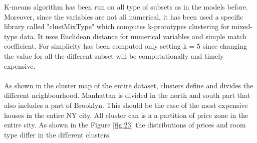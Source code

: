 \documentclass{FR16}
\begin{document}
K-means algorithm has been run on all type of subsets as in the models before. Moreover, since the variables are not all numerical, it has been used a specific library called "clustMixType" which computes k-prototypes clustering for mixed-type data. It uses Euclidean distance for numerical variables and simple match coefficient. For simplicity has been computed only setting k = 5 since changing the value for all the different subset will be computationally and timely expensive. \\\\
As shown in the cluster map of the entire dataset, clusters define and divides the different neighbourhood. Manhattan is divided in the north and south part that also includes a part of Brooklyn. This should be the case of the most expensive houses in the entire NY city. All cluster can is a a partition of price zone in the entire city. As shown in the Figure \ref{fig:23} the distributions of prices and room type differ in the different clusters.
\end{document}
